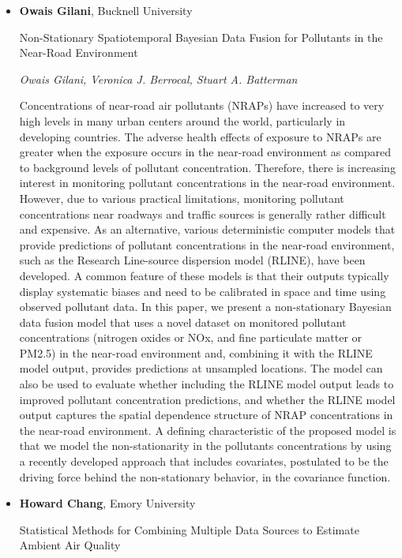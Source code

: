 \begin{itemize}
\item \textbf{Owais Gilani}, Bucknell University

Non-Stationary Spatiotemporal Bayesian Data Fusion for Pollutants in the Near-Road Environment

\emph{\footnotesize Owais Gilani, Veronica J. Berrocal, Stuart A. Batterman}

Concentrations of near-road air pollutants (NRAPs) have increased to very high levels in many urban centers around the world, particularly in developing countries. The adverse health effects of exposure to NRAPs are greater when the exposure occurs in the near-road environment as compared to background levels of pollutant concentration. Therefore, there is increasing interest in monitoring pollutant concentrations in the near-road environment. However, due to various practical limitations, monitoring pollutant concentrations near roadways and traffic sources is generally rather difficult and expensive. As an alternative, various deterministic computer models that provide predictions of pollutant concentrations in the near-road environment, such as the Research Line-source dispersion model (RLINE), have been developed. A common feature of these models is that their outputs typically display systematic biases and need to be calibrated in space and time using observed pollutant data. In this paper, we present a non-stationary Bayesian data fusion model that uses a novel dataset on monitored pollutant concentrations (nitrogen oxides  or NOx, and fine particulate matter or PM2.5) in the near-road environment and, combining it with the RLINE model output, provides predictions at unsampled locations. The model can also be used to evaluate whether including the RLINE model output leads to improved pollutant concentration predictions, and whether the RLINE model output captures the spatial dependence structure of NRAP concentrations in the near-road environment. A defining characteristic of the proposed model is that we model the non-stationarity in the pollutants concentrations by using a recently developed approach that includes covariates, postulated to be the driving force behind the non-stationary behavior, in the covariance function.

\item \textbf{Howard Chang}, Emory University

Statistical Methods for Combining Multiple Data Sources to Estimate Ambient Air Quality


\end{itemize}
